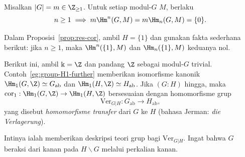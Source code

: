 \begin{korolari}\label{prop:group-coh-torsion}
	Misalkan $|G|=m\in\Z_{\geq1}$. Untuk setiap modul-$G$ $M$, berlaku
	\[ n \geq 1 \implies m \Hm^n(G, M) = m \Hm_n(G, M) = \{0\}. \]
\end{korolari}
\begin{bukti}
	Dalam Proposisi~\ref{prop:res-cor}, ambil $H=\{1\}$ dan gunakan fakta
	sederhana berikut: jika $n\geq1$, maka $\Hm^n(\{1\},M)$ dan
	$\Hm_n(\{1\},M)$ keduanya nol.
\end{bukti}

Berikut ini, ambil $\Bbbk=\Z$ dan pandang $\Z$ sebagai modul-$G$ trivial.
Contoh~\ref{eg:group-H1-further} memberikan isomorfisme kanonik
$\Hm_1(G,\Z)\simeq G_{\mathrm{ab}}$ dan
$\Hm_1(H,\Z)\simeq H_{\mathrm{ab}}$. Jika $(G:H)$ hingga, maka
$\mathrm{cor}_1:\Hm_1(G,\Z)\to\Hm_1(H,\Z)$ bersesuaian dengan
homomorfisme grup
\begin{equation*}
	\mathrm{Ver}_{G|H}: G_{\mathrm{ab}} \to H_{\mathrm{ab}},
\end{equation*}
yang disebut \emph{homomorfisme transfer} dari $G$ ke $H$ (bahasa Jerman:
\textit{die Verlagerung}).

Intinya ialah memberikan deskripsi teori grup bagi
$\mathrm{Ver}_{G|H}$. Ingat bahwa $G$ beraksi dari kanan pada
$H\backslash G$ melalui perkalian kanan.

